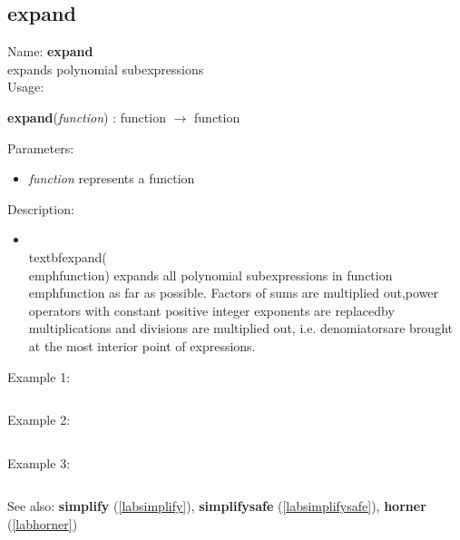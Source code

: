 \subsection{expand}
\label{labexpand}
\noindent Name: \textbf{expand}\\
expands polynomial subexpressions\\
\noindent Usage: 
\begin{center}
\textbf{expand}(\emph{function}) : \textsf{function} $\rightarrow$ \textsf{function}\\
\end{center}
Parameters: 
\begin{itemize}
\item \emph{function} represents a function
\end{itemize}
\noindent Description: \begin{itemize}

\item \\textbf{expand}(\\emph{function}) expands all polynomial subexpressions in function\n   \\emph{function} as far as possible. Factors of sums are multiplied out,\n   power operators with constant positive integer exponents are replaced\n   by multiplications and divisions are multiplied out, i.e. denomiators\n   are brought at the most interior point of expressions.\n\end{itemize}
\noindent Example 1: 
\begin{center}\begin{minipage}{15cm}\begin{Verbatim}[frame=single]
\end{Verbatim}
\end{minipage}\end{center}
\noindent Example 2: 
\begin{center}\begin{minipage}{15cm}\begin{Verbatim}[frame=single]
\end{Verbatim}
\end{minipage}\end{center}
\noindent Example 3: 
\begin{center}\begin{minipage}{15cm}\begin{Verbatim}[frame=single]
\end{Verbatim}
\end{minipage}\end{center}
See also: \textbf{simplify} (\ref{labsimplify}), \textbf{simplifysafe} (\ref{labsimplifysafe}), \textbf{horner} (\ref{labhorner})
